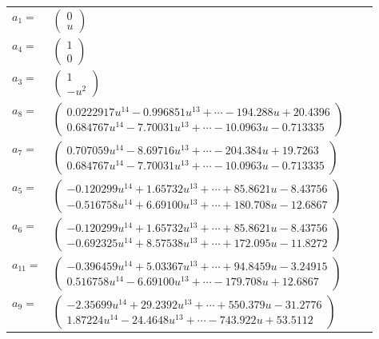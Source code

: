 \documentclass[1p]{elsarticle_modified}
\theoremstyle{definition}
\begin{document}
\begin{tabular}{m{7pt} m{180pt} m{7pt} m{180pt} }
\flushright $a_{1}=$&$\begin{pmatrix}0\\u\end{pmatrix}$ \\
\flushright $a_{4}=$&$\begin{pmatrix}1\\0\end{pmatrix}$ \\
\flushright $a_{3}=$&$\begin{pmatrix}1\\- u^2\end{pmatrix}$ \\
\flushright $a_{8}=$&$\begin{pmatrix}0.0222917 u^{14}-0.996851 u^{13}+\cdots-194.288 u+20.4396\\0.684767 u^{14}-7.70031 u^{13}+\cdots-10.0963 u-0.713335\end{pmatrix}$ \\
\flushright $a_{7}=$&$\begin{pmatrix}0.707059 u^{14}-8.69716 u^{13}+\cdots-204.384 u+19.7263\\0.684767 u^{14}-7.70031 u^{13}+\cdots-10.0963 u-0.713335\end{pmatrix}$ \\
\flushright $a_{5}=$&$\begin{pmatrix}-0.120299 u^{14}+1.65732 u^{13}+\cdots+85.8621 u-8.43756\\-0.516758 u^{14}+6.69100 u^{13}+\cdots+180.708 u-12.6867\end{pmatrix}$ \\
\flushright $a_{6}=$&$\begin{pmatrix}-0.120299 u^{14}+1.65732 u^{13}+\cdots+85.8621 u-8.43756\\-0.692325 u^{14}+8.57538 u^{13}+\cdots+172.095 u-11.8272\end{pmatrix}$ \\
\flushright $a_{11}=$&$\begin{pmatrix}-0.396459 u^{14}+5.03367 u^{13}+\cdots+94.8459 u-3.24915\\0.516758 u^{14}-6.69100 u^{13}+\cdots-179.708 u+12.6867\end{pmatrix}$ \\
\flushright $a_{9}=$&$\begin{pmatrix}-2.35699 u^{14}+29.2392 u^{13}+\cdots+550.379 u-31.2776\\1.87224 u^{14}-24.4648 u^{13}+\cdots-743.922 u+53.5112\end{pmatrix}$ \\

\end{tabular}
\end{document}
